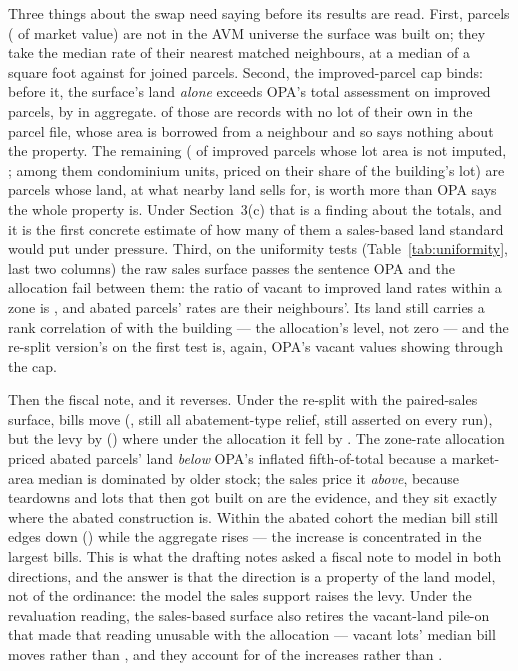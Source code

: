 \documentclass[11pt]{article}
\begin{document}
Three things about the swap need saying before its results are read. First, \LycdSfiveKnnParcels{}
parcels (\LycdSfiveKnnValuePct{} of market value) are not in the AVM universe the surface was
built on; they take the median rate of their nearest matched neighbours, at a median of
\LycdSfiveKnnFillPsf{} a square foot against \LycdSfiveJoinedPsf{} for joined parcels. Second,
the improved-parcel cap binds: before it, the surface's land \emph{alone} exceeds OPA's
total assessment on \LycdSfivePreCapExceeds{} improved parcels, by \LycdSfiveCapRemovedB{} in
aggregate. \LycdSfivePreCapExceedsImputed{} of those are records with no lot of their own in
the parcel file, whose area is borrowed from a neighbour and so says nothing about the
property. The remaining \LycdSfivePreCapExceedsCore{} (\LycdSfivePreCapExceedsCorePct{} of
improved parcels whose lot area is not imputed, \LycdSfiveCapRemovedCoreB{}; among them
\LycdSfivePreCapExceedsCondo{} condominium units, priced on their share of the building's lot)
are parcels whose land, at what nearby land sells for, is worth more than OPA says the whole
property is. Under Section~3(c) that is a finding about the
totals, and it is the first concrete estimate of how many of them a sales-based land standard
would put under pressure. Third, on the uniformity tests (Table~\ref{tab:uniformity}, last two
columns) the raw sales surface passes the sentence OPA and the allocation fail between them:
the ratio of vacant to improved land rates within a zone is \LycdUniSfiveVacantImprovedRatio{}, and
abated parcels' rates are \LycdUniSfiveAbatedRatio{} their neighbours'. Its land still carries a rank correlation of
\LycdUniSfiveBuildingCorr{} with the building --- the allocation's level, not zero --- and the
re-split version's \LycdUniSfiveResplitVacantImprovedRatio{} on the first test is, again, OPA's
vacant values showing through the cap.

Then the fiscal note, and it reverses. Under the re-split with the paired-sales surface,
\LycdSfiveCMoved{} bills move (\LycdSfiveCMovedPct{}, still all abatement-type relief, still
asserted on every run), but the levy \LycdSfiveCLevySign{} by \LycdSfiveCLevyAbsM{}
(\LycdSfiveCLevyPct{}) where under the allocation it fell by \LycdCLevyAbsM{}. The zone-rate
allocation priced abated parcels' land \emph{below} OPA's inflated fifth-of-total because a
market-area median is dominated by older stock; the sales price it \emph{above}, because
teardowns and lots that then got built on are the evidence, and they sit exactly where the
abated construction is. Within the abated cohort the median bill still edges down
(\LycdSfiveCAbatedMedianPct{}) while the aggregate rises --- the increase is concentrated in the
largest bills. This is what the drafting notes asked a fiscal note to model in
both directions, and the answer is that the direction is a property of the land model, not of
the ordinance: the model the sales support raises the levy. Under the revaluation reading, the
sales-based surface also retires the vacant-land pile-on that made that reading unusable with
the allocation --- vacant lots' median bill moves \LycdSfiveAVacantMedianPct{} rather than
\LycdAVacantMedianPct{}, and they account for \LycdSfiveAVacantShareOfShift{} of the increases
rather than \LycdAVacantShareOfShift{}.
\end{document}
